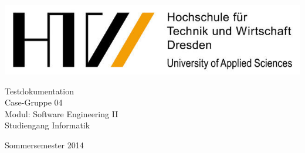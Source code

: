 \documentclass[a4paper,oneside,titlepage,12pt]{article}
\begin{document}
\begin{titlepage}
	\includegraphics{grafiken/HTW-Logo.png}
	\vspace*{3cm}
	\begin{center}
		\Huge{Testdokumentation\\} \vspace*{1cm}
		\huge{Case-Gruppe 04\\}
		\vspace*{1cm}
		\Large{
			Modul: Software Engineering II\\}
		\vspace*{2cm}
		\normalsize{
			Studiengang Informatik\\
		}
	\end{center}
	\vspace{2cm}
\begin{center}
\large{Sommersemester 2014}
\end{center}
	\vspace*{3cm}

\end{titlepage}

\thispagestyle{empty}\clearpage

\newtheorem{satz}{Satz}
\newtheorem{lemma}[satz]{Lemma}
\newtheorem{folgerung}[satz]{Folgerung}
\theoremstyle{definition}
\newtheorem{definition}[satz]{Definition}
\renewcommand{\proofname}{Beweis}

\setcounter{page}{3} \tableofcontents
{} \setcounter{roemisch}{\value{page}}
\clearpage

\setcounter{page}{2} 
\end{document}
